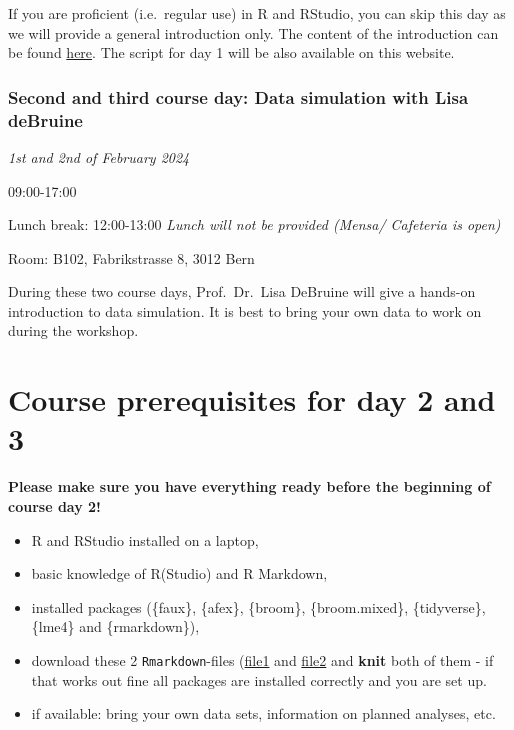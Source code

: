 \documentclass[
  letterpaper,
  DIV=11,
  numbers=noendperiod,
  oneside]{scrreprt}
\begin{document}
If you are proficient (i.e.~regular use) in R and RStudio, you can skip
this day as we will provide a general introduction only. The content of
the introduction can be found
\href{https://kogpsy.github.io/datasimulationcourse_24/introduction.html}{here}.
The script for day 1 will be also available on this website.

\hypertarget{second-and-third-course-day-data-simulation-with-lisa-debruine}{%
\subsubsection*{Second and third course day: Data simulation with Lisa
deBruine}\label{second-and-third-course-day-data-simulation-with-lisa-debruine}}

\emph{1st and 2nd of February 2024}

09:00-17:00

Lunch break: 12:00-13:00 \emph{Lunch will not be provided (Mensa/
Cafeteria is open)}

Room: B102, Fabrikstrasse 8, 3012 Bern

During these two course days, Prof.~Dr.~Lisa DeBruine will give a
hands-on introduction to data simulation. It is best to bring your own
data to work on during the workshop.

\hypertarget{course-prerequisites-for-day-2-and-3}{%
\section*{Course prerequisites for day 2 and
3}\label{course-prerequisites-for-day-2-and-3}}


\textbf{Please make sure you have everything ready before the beginning
of course day 2!}

\begin{itemize}
\item
  R and RStudio installed on a laptop,
\item
  basic knowledge of R(Studio) and R Markdown,
\item
  installed packages (\{faux\}, \{afex\}, \{broom\}, \{broom.mixed\},
  \{tidyverse\}, \{lme4\} and \{rmarkdown\}),
\item
  download these 2 \texttt{Rmarkdown}-files
  (\href{./downloadable_files/faux-stub.Rmd}{file1} and
  \href{./downloadable_files/mixed-stub.Rmd}{file2} and \textbf{knit}
  both of them - if that works out fine all packages are installed
  correctly and you are set up.
\item
  if available: bring your own data sets, information on planned
  analyses, etc.
\end{itemize}
\end{document}
